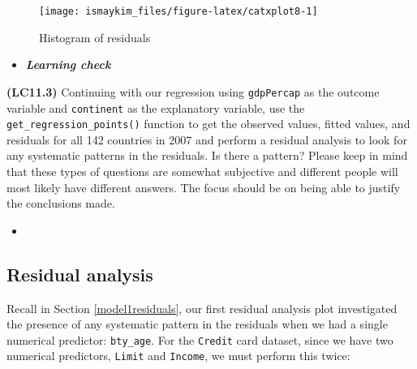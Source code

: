\documentclass[12pt, krantz2,]{krantz}
\makeatletter
\newenvironment{Shaded}{\begin{snugshade}}{\end{snugshade}}
\newcommand{\CommentTok}[1]{\textcolor[rgb]{0.37,0.37,0.37}{\textit{#1}}}
\newcommand{\DataTypeTok}[1]{\textcolor[rgb]{0.27,0.27,0.27}{#1}}
\newcommand{\KeywordTok}[1]{\textcolor[rgb]{0.27,0.27,0.27}{\textbf{#1}}}
\newcommand{\NormalTok}[1]{#1}
\newcommand{\OperatorTok}[1]{\textcolor[rgb]{0.43,0.43,0.43}{\textbf{#1}}}
\newcommand{\StringTok}[1]{\textcolor[rgb]{0.5,0.5,0.5}{#1}}
\newenvironment{kframe}{%
\medskip{}
\setlength{\fboxsep}{.8em}
 \def\at@end@of@kframe{}%
 \ifinner\ifhmode%
  \def\at@end@of@kframe{\end{minipage}}%
  \begin{minipage}{\columnwidth}%
 \fi\fi%
 \def\FrameCommand##1{\hskip\@totalleftmargin \hskip-\fboxsep
 \colorbox{shadecolor}{##1}\hskip-\fboxsep
     \hskip-\linewidth \hskip-\@totalleftmargin \hskip\columnwidth}%
 \MakeFramed {\advance\hsize-\width
   \@totalleftmargin\z@ \linewidth\hsize
   \@setminipage}}%
 {\par\unskip\endMakeFramed%
 \at@end@of@kframe}
\renewenvironment{Shaded}{\begin{kframe}}{\end{kframe}}
\newenvironment{rmdblock}[1]
  {\begin{shaded*}
  \begin{itemize}
  \renewcommand{\labelitemi}{
    \raisebox{-.7\height}[0pt][0pt]{
    }
  }
  \item
  }
  {
  \end{itemize}
  \end{shaded*}
  }
\newenvironment{learncheck}
  {\begin{rmdblock}{warning}}
  {\end{rmdblock}}
\makeatother
\begin{document}
\begin{figure}

{\centering \texttt{[image: ismaykim\_files/figure-latex/catxplot8-1]} 

}

\caption{Histogram of residuals}\label{fig:catxplot8}
\end{figure}

\begin{learncheck}
\textbf{\emph{Learning check}}
\end{learncheck}

\textbf{(LC11.3)} Continuing with our regression using \texttt{gdpPercap} as the outcome variable and \texttt{continent} as the explanatory variable, use the \texttt{get\_regression\_points()} function to get the observed values, fitted values, and residuals for all 142 countries in 2007 and perform a residual analysis to look for any systematic patterns in the residuals. Is there a pattern? Please keep in mind that these types of questions are somewhat subjective and different people will most likely have different answers. The focus should be on being able to justify the conclusions made.

\begin{learncheck}

\end{learncheck}

\hypertarget{model3residuals}{%
\subsection{Residual analysis}\label{model3residuals}}

Recall in Section \ref{model1residuals}, our first residual analysis plot investigated the presence of any systematic pattern in the residuals when we had a single numerical predictor: \texttt{bty\_age}. For the \texttt{Credit} card dataset, since we have two numerical predictors, \texttt{Limit} and \texttt{Income}, we must perform this twice:

\begin{Shaded}
\end{Shaded}
\end{document}
